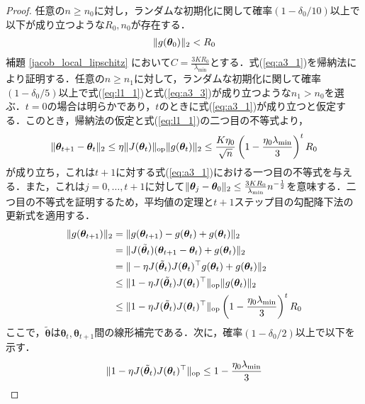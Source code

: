 \begin{proof}
    任意の$n \geq n_0$に対し，ランダムな初期化に関して確率$(1 - \delta_0 / 10)$以上で以下が成り立つような$R_0, n_0$が存在する．
    \begin{align}
        \label{eq:a3_3}
        \|g(\bm{\theta}_0)\|_2 < R_0
    \end{align}
    補題 \ref{jacob_local_lipschitz} において$C = \frac{3KR_0}{\lambda_{\min}}$とする．式(\ref{eq:a3_1})を帰納法により証明する．任意の$n \geq n_1$に対して，ランダムな初期化に関して確率$(1 - \delta_0 / 5)$以上で式(\ref{eq:l1_1})と式(\ref{eq:a3_3})が成り立つような$n_1 > n_0$を選ぶ．$t=0$の場合は明らかであり，$t$のときに式(\ref{eq:a3_1})が成り立つと仮定する．このとき，帰納法の仮定と式(\ref{eq:l1_1})の二つ目の不等式より，
    \begin{align}
        \|\bm{\theta}_{t+1} - \bm{\theta}_t\|_2 \leq \eta\|J(\bm{\theta}_t)\|_{\mathrm{op}}\|g(\bm{\theta}_t)\|_2 \leq \dfrac{K\eta_0}{\sqrt{n}}\left(1 - \dfrac{\eta_0 \lambda_{\min}}{3}\right)^t R_0
    \end{align}
    が成り立ち，これは$t+1$に対する式(\ref{eq:a3_1})における一つ目の不等式を与える．また，これは$j=0,\ldots,t+1$に対して$\|\bm{\theta}_j - \bm{\theta}_0\|_2 \leq \frac{3KR_0}{\lambda_{\min}}n^{-\frac{1}{2}}$を意味する．二つ目の不等式を証明するため，平均値の定理と$t+1$ステップ目の勾配降下法の更新式を適用する．
    \begin{align}
        \|g(\bm{\theta}_{t+1})\|_2 &= \|g(\bm{\theta}_{t+1}) - g(\bm{\theta}_t) + g(\bm{\theta}_t)\|_2 \\
        &= \|J(\tilde{\bm{\theta}}_t)(\bm{\theta}_{t+1} - \bm{\theta}_t) + g(\bm{\theta}_t)\|_2 \\
        &= \|-\eta J(\tilde{\bm{\theta}}_t)J(\bm{\theta}_t)^\top g(\bm{\theta}_t) + g(\bm{\theta}_t)\|_2 \\
        &\leq \|1 - \eta J(\tilde{\bm{\theta}}_t)J(\bm{\theta}_t)^\top\|_{\mathrm{op}}\|g(\bm{\theta}_t)\|_2 \\
        &\leq \|1 - \eta J(\tilde{\bm{\theta}}_t)J(\bm{\theta}_t)^\top\|_{\mathrm{op}}\left(1 - \dfrac{\eta_0 \lambda_{\min}}{3}\right)^t R_0
    \end{align}
    ここで，$\tilde{\bm{\theta}}$は$\bm{\theta}_t, \bm{\theta}_{t+1}$間の線形補完である．次に，確率$(1 - \delta_0 / 2)$以上で以下を示す．
    \begin{align}
        \norm{1 - \eta J(\tilde{\bm{\theta}}_t)J(\bm{\theta}_t)^\top}_{\mathrm{op}} \leq 1 - \dfrac{\eta_0 \lambda_{\min}}{3}

\end{align}
\end{proof}
